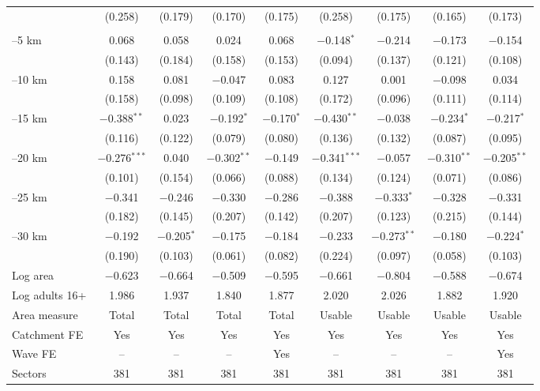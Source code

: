 \documentclass[11pt]{article}
\begin{document}
\begin{table}[H]
\begin{adjustbox}{max width=\textwidth, max totalheight=0.8\textheight}
\begin{tabular}{lcccccccc}
 & (0.258) & (0.179) & (0.170) & (0.175) & (0.258) & (0.175) & (0.165) & (0.173) \\
\addlinespace
\multicolumn{9}{l}{\textit{Catchment: Volcanoes}} \\
\quad 0--5 km & 0.068 & 0.058 & 0.024 & 0.068 & $-$0.148$^{*}$ & $-$0.214 & $-$0.173 & $-$0.154 \\
 & (0.143) & (0.184) & (0.158) & (0.153) & (0.094) & (0.137) & (0.121) & (0.108) \\
\quad 5--10 km & 0.158 & 0.081 & $-$0.047 & 0.083 & 0.127 & 0.001 & $-$0.098 & 0.034 \\
 & (0.158) & (0.098) & (0.109) & (0.108) & (0.172) & (0.096) & (0.111) & (0.114) \\
\quad 10--15 km & $-$0.388$^{**}$ & 0.023 & $-$0.192$^{*}$ & $-$0.170$^{*}$ & $-$0.430$^{**}$ & $-$0.038 & $-$0.234$^{*}$ & $-$0.217$^{*}$ \\
 & (0.116) & (0.122) & (0.079) & (0.080) & (0.136) & (0.132) & (0.087) & (0.095) \\
\quad 15--20 km & $-$0.276$^{***}$ & 0.040 & $-$0.302$^{**}$ & $-$0.149 & $-$0.341$^{***}$ & $-$0.057 & $-$0.310$^{**}$ & $-$0.205$^{**}$ \\
 & (0.101) & (0.154) & (0.066) & (0.088) & (0.134) & (0.124) & (0.071) & (0.086) \\
\quad 20--25 km & $-$0.341 & $-$0.246 & $-$0.330 & $-$0.286 & $-$0.388 & $-$0.333$^{*}$ & $-$0.328 & $-$0.331 \\
 & (0.182) & (0.145) & (0.207) & (0.142) & (0.207) & (0.123) & (0.215) & (0.144) \\
\quad 25--30 km & $-$0.192 & $-$0.205$^{*}$ & $-$0.175 & $-$0.184 & $-$0.233 & $-$0.273$^{**}$ & $-$0.180 & $-$0.224$^{*}$ \\
 & (0.190) & (0.103) & (0.061) & (0.082) & (0.224) & (0.097) & (0.058) & (0.103) \\
\addlinespace
\midrule
Log area & $-$0.623 & $-$0.664 & $-$0.509 & $-$0.595 & $-$0.661 & $-$0.804 & $-$0.588 & $-$0.674 \\
Log adults 16+ & 1.986 & 1.937 & 1.840 & 1.877 & 2.020 & 2.026 & 1.882 & 1.920 \\
Area measure & Total & Total & Total & Total & Usable & Usable & Usable & Usable \\
Catchment FE & Yes & Yes & Yes & Yes & Yes & Yes & Yes & Yes \\
Wave FE & -- & -- & -- & Yes & -- & -- & -- & Yes \\
Sectors & 381 & 381 & 381 & 381 & 381 & 381 & 381 & 381 \\

\end{tabular}
\end{adjustbox}
\end{table}
\end{document}

